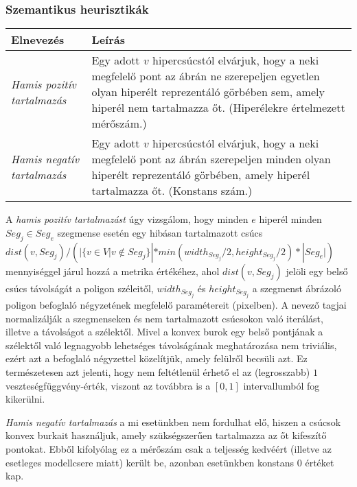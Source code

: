\subsubsection{Szemantikus heurisztikák}

\begin{table}[H]
	\centering
	\begin{tabular}{ | m{} | m{} | }
		\hline
		\textbf{Elnevezés} & \textbf{Leírás} \\
		\hline \hline %
		\emph{Hamis pozitív tartalmazás} & Egy adott $v$ hipercsúcstól elvárjuk, hogy a neki megfelelő pont az ábrán ne szerepeljen egyetlen olyan hiperélt reprezentáló görbében sem, amely hiperél nem tartalmazza őt. (Hiperélekre értelmezett mérőszám.) \\
		\hline
		\emph{Hamis negatív tartalmazás} & Egy adott $v$ hipercsúcstól elvárjuk, hogy a neki megfelelő pont az ábrán szerepeljen minden olyan hiperélt reprezentáló görbében, amely hiperél tartalmazza őt. (Konstans szám.) \\
		\hline
	\end{tabular}
\end{table}

A \textit{hamis pozitív tartalmazást} úgy vizsgálom, hogy minden $e$ hiperél minden $Seg_j \in Seg_{e}$ szegmense esetén egy hibásan tartalmazott csúcs $dist(v, Seg_j) / (|\{v \in V | v \notin Seg_j\}|*min(width_{Seg_j} / 2, height_{Seg_j} / 2)*|Seg_{e}|)$ mennyiséggel járul hozzá a metrika értékéhez, ahol $dist(v, Seg_j)$ jelöli egy belső csúcs távolságát a poligon széleitől, $width_{Seg_j}$ és $height_{Seg_j}$ a szegmenst ábrázoló poligon befoglaló négyzetének megfelelő paramétereit (pixelben). A nevező tagjai normalizálják a szegmenseken és nem tartalmazott csúcsokon való iterálást, illetve a távolságot a szélektől. Mivel a konvex burok egy belső pontjának a szélektől való legnagyobb lehetséges távolságának meghatározása nem triviális, ezért azt a befoglaló négyzettel közelítjük, amely felülről becsüli azt. Ez természetesen azt jelenti, hogy nem feltétlenül érhető el az (legrosszabb) $1$ veszteségfüggvény-érték, viszont az továbbra is a $[0, 1]$ intervallumból fog kikerülni.


\textit{Hamis negatív tartalmazás} a mi esetünkben nem fordulhat elő, hiszen a csúcsok konvex burkait használjuk, amely szükségszerűen tartalmazza az őt kifeszítő pontokat. Ebből kifolyólag ez a mérőszám csak a teljesség kedvéért (illetve az esetleges modellcsere miatt) került be, azonban esetünkben konstans $0$ értéket kap.

